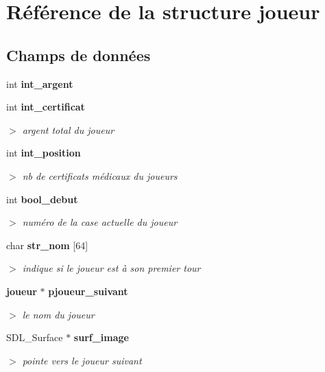 \section{R\'{e}f\'{e}rence de la structure joueur}
\label{structjoueur}
\subsection*{Champs de donn\'{e}es}
\begin{CompactItemize}
\item 
int {\bf int\_\-argent}
\item 
int {\bf int\_\-certificat}
\begin{CompactList}\small\item\em $>$ argent total du joueur \item\end{CompactList}\item 
int {\bf int\_\-position}
\begin{CompactList}\small\item\em $>$ nb de certificats m\'{e}dicaux du joueurs \item\end{CompactList}\item 
int {\bf bool\_\-debut}
\begin{CompactList}\small\item\em $>$ num\'{e}ro de la case actuelle du joueur \item\end{CompactList}\item 
char {\bf str\_\-nom} [64]
\begin{CompactList}\small\item\em $>$ indique si le joueur est \`{a} son premier tour \item\end{CompactList}\item 
{\bf joueur} $\ast$ {\bf pjoueur\_\-suivant}
\begin{CompactList}\small\item\em $>$ le nom du joueur \item\end{CompactList}\item 
SDL\_\-Surface $\ast$ {\bf surf\_\-image}
\begin{CompactList}\small\item\em $>$ pointe vers le joueur suivant \item\end{CompactList}\item 

\end{CompactItemize}
